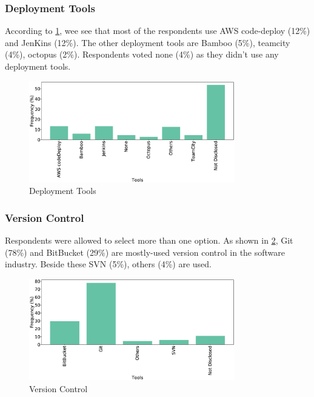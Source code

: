 \subsubsection{Deployment Tools}
According to \cref{fig:deployTools}, wee see that most of the respondents use AWS code-deploy (12\%) and JenKins (12\%). The other deployment tools are Bamboo (5\%), teamcity (4\%), octopus (2\%). Respondents voted none (4\%) as they didn’t use any deployment tools.
\begin{figure}[htbp]
\centering
  \includegraphics[width=0.8\textwidth]{Figures/Respondents_deployment_tools}
  \caption{Deployment Tools}
  \label{fig:deployTools}
\end{figure}

\subsubsection{Version Control}
Respondents were allowed to select more than one option. As shown in \cref{fig:versionControl}, Git (78\%) and BitBucket (29\%) are mostly-used version control in the software industry. Beside these SVN (5\%), others (4\%) are used.
\begin{figure}[htbp]
\centering
  \includegraphics[width=0.8\textwidth]{Figures/Respondents_version_control}
  \caption{Version Control}
  \label{fig:versionControl}
\end{figure}